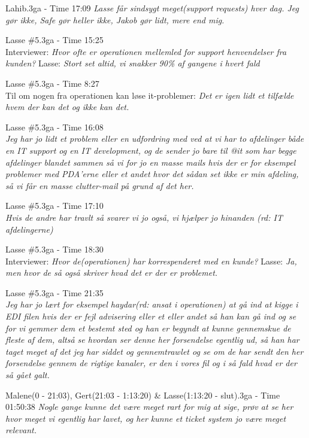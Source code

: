 \begin{thebibliography}{9}
	Lahib.3ga - Time 17:09
	\textit{Lasse får sindsygt meget(support requests) hver dag. Jeg gør ikke, Safe gør heller ikke, Jakob gør lidt, mere end mig.}

	Lasse \#5.3ga - Time 15:25 \\
	Interviewer: \textit{Hvor ofte er operationen mellemled for support henvendelser fra kunden?} Lasse: \textit{Stort set altid, vi snakker 90\% af gangene i hvert fald}

	Lasse \#5.3ga - Time 8:27 \\
	Til om nogen fra operationen kan løse it-problemer: \textit{Det er igen lidt et tilfælde hvem der kan det og ikke kan det.}

	Lasse \#5.3ga - Time 16:08 \\
	\textit{Jeg har jo lidt et problem eller en udfordring med ved at vi har to afdelinger både en IT support og en IT development, og de sender jo bare til @it som har begge afdelinger blandet sammen så vi for jo en masse mails hvis der er for eksempel problemer med PDA’erne eller et andet hvor det sådan set ikke er min afdeling, så vi får en masse clutter-mail på grund af det her.}

	Lasse \#5.3ga - Time 17:10 \\
	\textit{Hvis de andre har travlt så svarer vi jo også, vi hjælper jo hinanden \emph{(rd: IT afdelingerne)}}

	Lasse \#5.3ga - Time 18:30 \\
	Interviewer: \textit{Hvor de(operationen) har korrespenderet med en kunde?} Lasse: \textit{Ja, men hvor de så også skriver hvad det er der er problemet.}

	Lasse \#5.3ga - Time 21:35 \\
	\textit{Jeg har jo lært for eksempel haydar\emph{(rd: ansat i operationen)} at gå ind at kigge i EDI filen hvis der er fejl advisering eller et eller andet så han kan gå ind og se for vi gemmer dem et bestemt sted og han er begyndt at kunne gennemskue de fleste af dem, altså se hvordan ser denne her forsendelse egentlig ud, så han har taget meget af det jeg har siddet og gennemtrawlet og se om de har sendt den her forsendelse gennem de rigtige kanaler, er den i vores fil og i så fald hvad er der så gået galt.}

	Malene(0 - 21:03), Gert(21:03 - 1:13:20) \& Lasse(1:13:20 - slut).3ga - Time 01:50:38
	\textit{Nogle gange kunne det være meget rart for mig at sige, prøv at se her hvor meget vi egentlig har lavet, og her kunne et ticket system jo være meget relevant.}


\end{thebibliography}
